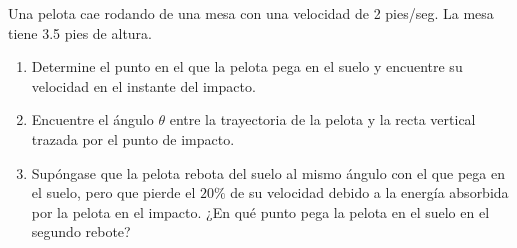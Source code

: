 \item Una pelota cae rodando de una mesa con una velocidad de 2 pies/seg. La mesa tiene 3.5 pies de altura.
    \begin{enumerate}
        \item Determine el punto en el que la pelota pega en el suelo y encuentre su velocidad en el instante del impacto.
        \item Encuentre el ángulo $\theta$ entre la trayectoria de la pelota y la recta vertical trazada por el punto de impacto.
        \item Supóngase que la pelota rebota del suelo al mismo ángulo con el que pega en el suelo, pero que pierde el $20\%$ de su velocidad debido a la energía absorbida por la pelota en el impacto. ¿En qué punto pega la pelota en el suelo en el segundo rebote?
    \end{enumerate}
